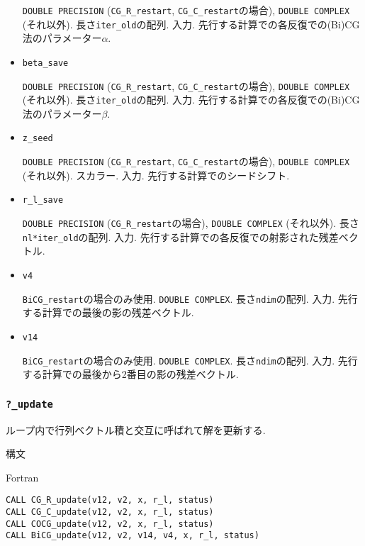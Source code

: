 \documentclass[12pt,titlepage]{jarticle}
\begin{document}
\begin{itemize}
  \verb|DOUBLE PRECISION| (\verb|CG_R_restart|, \verb|CG_C_restart|の場合),
  \verb|DOUBLE COMPLEX| (それ以外).
  長さ\verb|iter_old|の配列. 入力. 先行する計算での各反復での(Bi)CG法のパラメーター$\alpha$.

\item \verb|beta_save|

  \verb|DOUBLE PRECISION| (\verb|CG_R_restart|, \verb|CG_C_restart|の場合),
  \verb|DOUBLE COMPLEX| (それ以外).
  長さ\verb|iter_old|の配列. 入力. 先行する計算での各反復での(Bi)CG法のパラメーター$\beta$.

\item \verb|z_seed|

  \verb|DOUBLE PRECISION| (\verb|CG_R_restart|, \verb|CG_C_restart|の場合),
  \verb|DOUBLE COMPLEX| (それ以外).
  スカラー. 入力. 先行する計算でのシードシフト.

\item \verb|r_l_save|
  
  \verb|DOUBLE PRECISION| (\verb|CG_R_restart|の場合),
  \verb|DOUBLE COMPLEX| (それ以外).
  長さ\verb|nl*iter_old|の配列. 入力.
  先行する計算での各反復での射影された残差ベクトル.

\item \verb|v4|

  \verb|BiCG_restart|の場合のみ使用.
  \verb|DOUBLE COMPLEX|.
  長さ\verb|ndim|の配列. 入力.
  先行する計算での最後の影の残差ベクトル.

\item \verb|v14|

  \verb|BiCG_restart|の場合のみ使用.
  \verb|DOUBLE COMPLEX|.
  長さ\verb|ndim|の配列. 入力.
  先行する計算での最後から2番目の影の残差ベクトル.

\end{itemize}

\subsubsection{\texttt{?\_update}}

ループ内で行列ベクトル積と交互に呼ばれて解を更新する.

\noindent 構文

\noindent Fortran
\begin{verbatim}
CALL CG_R_update(v12, v2, x, r_l, status)
CALL CG_C_update(v12, v2, x, r_l, status)
CALL COCG_update(v12, v2, x, r_l, status)
CALL BiCG_update(v12, v2, v14, v4, x, r_l, status)
\end{verbatim}
\end{document}
